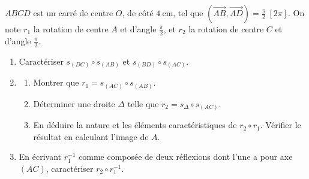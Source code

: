 \begin{exo}\label{exo:isom-carre-reflexions}
      $ABCD$ est un carré de centre $O$, de côté $4~\mathrm{cm}$, tel que
      $(\overrightarrow{AB},\overrightarrow{AD}) = \frac{\pi}{2}\ [2\pi]$.
      On note $r_1$ la rotation de centre $A$ et d'angle $\frac{\pi}{2}$, et $r_2$ la rotation de centre $C$ et d'angle $\frac{\pi}{2}$.
      \begin{enumerate}
            \item Caractériser $s_{(DC)} \circ s_{(AB)}$ et $s_{(BD)} \circ s_{(AC)}$.
            \item \begin{enumerate}
                        \item Montrer que $r_1 = s_{(AC)} \circ s_{(AB)}$.
                        \item Déterminer une droite $\Delta$ telle que $r_2 = s_{\Delta} \circ s_{(AC)}$.
                        \item En déduire la nature et les éléments caractéristiques de $r_2 \circ r_1$.
                              Vérifier le résultat en calculant l'image de $A$.
                  \end{enumerate}
            \item En écrivant $r_1^{-1}$ comme composée de deux réflexions dont l'une a pour axe $(AC)$,
                  caractériser $r_2 \circ r_1^{-1}$.
      \end{enumerate}
\end{exo}
